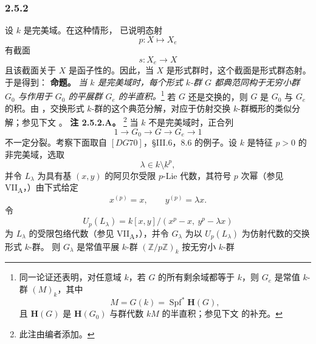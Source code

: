 
\subsubsection*{2.5.2}
\label{sga3:VIIB:2.5.2}
设 \(k\) 是完美域。在这种情形， 已说明态射
\[
  p:X\longmapsto X_e
\]
有截面
\[
  s:X_e\longrightarrow X
\]
且该截面关于 \(X\) 是函子性的。因此，当 \(X\) 是形式群时，这个截面是形式群态射。于是得到：
\medskip
\noindent\textbf{命题。}
\label{sga3:VIIB:2.5.2:proposition}
{\itshape 当 \(k\) 是完美域时，每个形式 \(k\)-群 \(G\) 都典范同构于无穷小群 \(G_0\) 与作用于 \(G_0\) 的平展群 \(G_e\) 的半直积。}\footnote{%
\label{sga3:VIIB:nde:100}同一论证还表明，对任意域 \(k\)，若 \(G\) 的所有剩余域都等于 \(k\)，则 \(G_e\) 是常值 \(k\)-群 \((M)_k\)，其中
\[
  M=G(k)=\operatorname{Spf}^{*}\mathbf H(G),
\]
且 \(\mathbf H(G)\) 是 \(\mathbf H(G_0)\) 与群代数 \(kM\) 的半直积；参见下文  的补充。}
若 \(G\) 还是交换的，则 \(G\) 是 \(G_0\) 与 \(G_e\) 的积。由 ，交换形式 \(k\)-群的这个典范分解，对应于仿射交换 \(k\)-群概形的类似分解；参见下文 。
\medskip
\noindent\textbf{注 2.5.2.A。}
\label{sga3:VIIB:2.5.2.A}
\footnote{\label{sga3:VIIB:nde:101}此注由编者添加。}
当 \(k\) 不是完美域时，正合列
\[
  1\longrightarrow G_0\longrightarrow G\longrightarrow G_e
  \longrightarrow 1
\]
不一定分裂。考察下面取自 \([DG70]\)，§III.6，8.6 的例子。设 \(k\) 是特征 \(p>0\) 的非完美域，选取
\[
  \lambda\in k\setminus k^p,
\]
并令 \(L_\lambda\) 为具有基 \((x,y)\) 的阿贝尔受限 \(p\)-Lie 代数，其符号 \(p\) 次幂\textup{（参见 VII\textsubscript{A}，）}由下式给定
\[
  x^{(p)}=x,
  \qquad
  y^{(p)}=\lambda x.
\]
令
\[
  U_p(L_\lambda)
  =
  k[x,y]/(x^p-x,\ y^p-\lambda x)
\]
为 \(L_\lambda\) 的受限包络代数\textup{（参见 VII\textsubscript{A}，）}，并令 \(G_\lambda\) 为以 \(U_p(L_\lambda)\) 为仿射代数的交换形式 \(k\)-群。
则 \(G_\lambda\) 是常值平展 \(k\)-群 \((\mathbb Z/p\mathbb Z)_k\) 按无穷小 \(k\)-群
